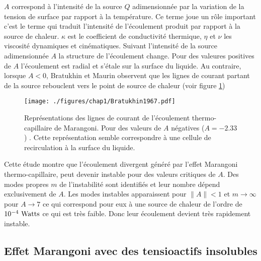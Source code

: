   $A$ correspond à l'intensité de la source $Q$ adimensionnée par la variation de la tension de surface par rapport à la température. Ce terme joue un rôle important c'est le terme qui traduit l'intensité de l'écoulement produit par rapport à la source de chaleur. $\kappa$ est le coefficient de conductivité thermique, $\eta$ et $\nu$ les viscosité dynamiques et cinématiques. Suivant l'intensité de la source adimensionnée $A$ la structure de l'écoulement change. Pour des valeures positives de $A$ l'écoulement est radial et s'étale sur la surface du liquide. Au contraire, lorsque $A<0$, Bratukhin  et Maurin observent que les lignes de courant partant de la source rebouclent vers le point de source de chaleur (voir figure \ref{fig:Bratukhin})
  \begin{figure}[!ht]
    \centering
    \texttt{[image: ./figures/chap1/Bratukhin1967.pdf]}
    \caption{Représentations des lignes de courant de l'écoulement thermo-capillaire de Marangoni. Pour des valeurs de $A$ négatives ($A=-2.33$) \cite{Bratukhin1967}. Cette représentation semble correspondre à une cellule de recirculation à la surface du liquide.}
    \label{fig:Bratukhin}
  \end{figure}
  
  Cette étude montre que l'écoulement divergent généré par l'effet Marangoni thermo-capillaire, peut devenir instable pour des valeurs critiques de $A$. Des modes propres $m$ de l'instabilité sont identifiés et leur nombre dépend exclusivement de $A$. Les modes instables apparaissent pour $\|A\|<1$ et $m \rightarrow \infty$ pour $A\rightarrow 7$ ce qui correspond pour eux à une source de chaleur de l'ordre de $10^{-4}~\rm Watts$ ce qui est très faible. Donc leur écoulement devient très rapidement instable. 



  \subsection{Effet Marangoni avec des tensioactifs insolubles}

